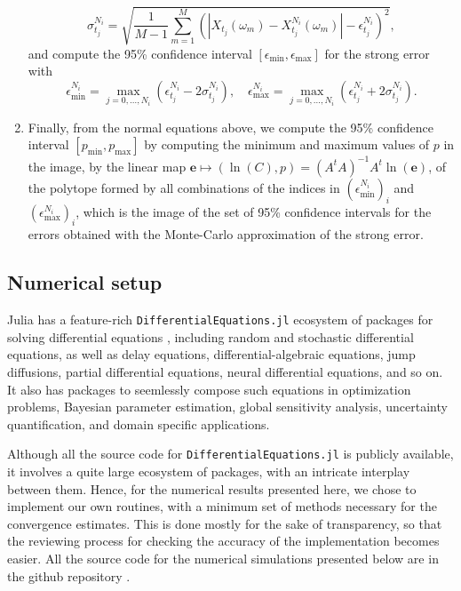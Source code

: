 \documentclass[reqno,12pt]{amsart}
\theoremstyle{plain} %
\theoremstyle{definition} %
\begin{document}
\begin{enumerate}
    \[
        \sigma_{t_j}^{N_i} = \sqrt{\frac{1}{M-1}\sum_{m=1}^M \left(\left|X_{t_j}(\omega_m) - X_{t_j}^{N_i}(\omega_m) \right|- \epsilon_{t_j}^{N_i}\right)^2},
    \]
    and compute the 95\% confidence interval $[\epsilon_{\min}, \epsilon_{\max}]$ for the strong error with
    \[
        \epsilon_{\min}^{N_i} = \max_{j=0, \ldots, N_i} (\epsilon_{t_j}^{N_i} - 2\sigma_{t_j}^{N_i}), \quad \epsilon_{\max}^{N_i} = \max_{j=0, \ldots, N_i} (\epsilon_{t_j}^{N_i} + 2\sigma_{t_j}^{N_i}).
    \]
    \item Finally, from the normal equations above, we compute the 95\% confidence interval $[p_{\min}, p_{\max}]$ by computing the minimum and maximum values of $p$ in the image, by the linear map $\mathbf{e} \mapsto (\ln(C), p) = (A^tA)^{-1}A^t\ln(\mathbf{e})$, of the polytope formed by all combinations of the indices in $(\epsilon_{\min}^{N_i})_i$ and $(\epsilon_{\max}^{N_i})_i$, which is the image of the set of 95\% confidence intervals for the errors obtained with the Monte-Carlo approximation of the strong error.
\end{enumerate}

\subsection{Numerical setup}
\label{secnumericalsetup}

Julia has a feature-rich \texttt{DifferentialEquations.jl} ecosystem of packages for solving differential equations \cite{DifferentialEquations.jl-2017}, including random and stochastic differential equations, as well as delay equations, differential-algebraic equations, jump diffusions, partial differential equations, neural differential equations, and so on. It also has packages to seemlessly compose such equations in optimization problems, Bayesian parameter estimation, global sensitivity analysis, uncertainty quantification, and domain specific applications.

Although all the source code for \texttt{DifferentialEquations.jl} is publicly available, it involves a quite large ecosystem of packages, with an intricate interplay between them. Hence, for the numerical results presented here, we chose to implement our own routines, with a minimum set of methods necessary for the convergence estimates. This is done mostly for the sake of transparency, so that the reviewing process for checking the accuracy of the implementation becomes easier. All the source code for the numerical simulations presented below are in the github repository \cite{RODEConvEM2023}.
\end{document}
